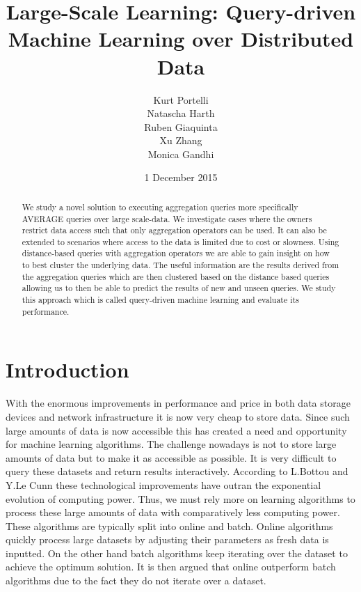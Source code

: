 \documentclass{lmproj}
\begin{document}
\title{Large-Scale Learning: Query-driven Machine Learning over Distributed Data}
\author{Kurt Portelli \\
        Natascha Harth \\
        Ruben Giaquinta \\
        Xu Zhang \\
        Monica Gandhi}
\date{1 December 2015}
\maketitle
\begin{abstract}
We study a novel solution to executing aggregation queries more specifically AVERAGE queries over large scale-data. We investigate cases where the owners restrict data access such that only aggregation operators can be used. It can also be extended to scenarios where access to the data is limited due to cost or slowness. Using distance-based queries with aggregation operators we are able to gain insight on how to best cluster the underlying data. The useful information are the results derived from the aggregation queries which are then clustered based on the distance based queries allowing us to then be able to predict the results of new and unseen queries. We study this approach which is called query-driven machine learning and evaluate its performance.

\end{abstract}
\educationalconsent
\tableofcontents
\chapter{Introduction}
\label{intro}
With the enormous improvements in performance and price in both data storage devices and network infrastructure it is now very cheap to store data. Since such large amounts of data is now accessible this has created a need and opportunity for machine learning algorithms.\cite{LargeScaleOnlineLearning} The challenge nowadays is not to store large amounts of data but to make it as accessible as possible. It is very difficult to query these datasets and return results interactively. According to L.Bottou and Y.Le Cunn\cite{LargeScaleOnlineLearning} these technological improvements have outran the exponential evolution of computing power. Thus, we must rely more on learning algorithms to process these large amounts of data with comparatively less computing power. These algorithms are typically split into online and batch. Online algorithms quickly process large datasets by adjusting their parameters as fresh data is inputted. On the other hand batch algorithms keep iterating over the dataset to achieve the optimum solution. It is then argued that online outperform batch algorithms due to the fact they do not iterate over a dataset.\cite{LargeScaleOnlineLearning}
\end{document}
